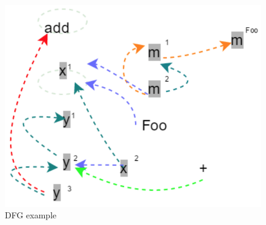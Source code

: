 \documentclass{article}
\begin{document}
\begin{figure}[ht]
    \centerline{\includegraphics[width=\columnwidth]{Images/Similarity2-5b.png}}
    \caption{DFG example}
\end{figure}
\end{document}
